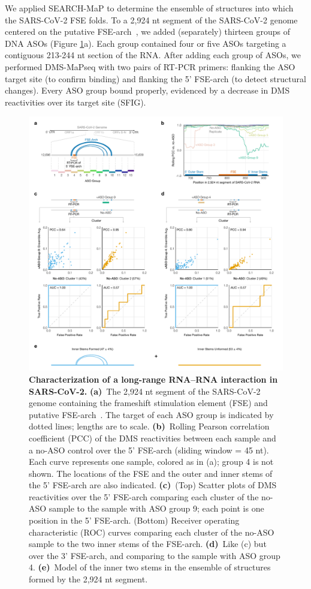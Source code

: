 \documentclass[main.tex]{subfiles}
\begin{document}
We applied SEARCH-MaP to determine the ensemble of structures into which the SARS-CoV-2 FSE folds.
To a 2,924 nt segment of the SARS-CoV-2 genome centered on the putative FSE-arch~\cite{Ziv2020}, we added (separately) thirteen groups of DNA ASOs (Figure \ref{tiles}a).
Each group contained four or five ASOs targeting a contiguous 213-244 nt section of the RNA.
After adding each group of ASOs, we performed DMS-MaPseq with two pairs of RT-PCR primers: flanking the ASO target site (to confirm binding) and flanking the 5' FSE-arch (to detect structural changes).
Every ASO group bound properly, evidenced by a decrease in DMS reactivities over its target site (SFIG).

\begin{figure}[H]
	\includegraphics[width=\textwidth]{../MainFigures/sars2-tile/sars2-tile.pdf}
	\caption{\textbf{Characterization of a long-range RNA--RNA interaction in SARS-CoV-2.} \textbf{(a)}~The 2,924 nt segment of the SARS-CoV-2 genome containing the frameshift stimulation element (FSE) and putative FSE-arch~\cite{Ziv2020}. The target of each ASO group is indicated by dotted lines; lengths are to scale. \textbf{(b)}~Rolling Pearson correlation coefficient (PCC) of the DMS reactivities between each sample and a no-ASO control over the 5' FSE-arch (sliding window = 45 nt). Each curve represents one sample, colored as in (a); group 4 is not shown. The locations of the FSE and the outer and inner stems of the 5' FSE-arch are also indicated. \textbf{(c)}~(Top) Scatter plots of DMS reactivities over the 5' FSE-arch comparing each cluster of the no-ASO sample to the sample with ASO group 9; each point is one position in the 5' FSE-arch. (Bottom) Receiver operating characteristic (ROC) curves comparing each cluster of the no-ASO sample to the two inner stems of the FSE-arch. \textbf{(d)}~Like (c) but over the 3' FSE-arch, and comparing to the sample with ASO group 4. \textbf{(e)}~Model of the inner two stems in the ensemble of structures formed by the 2,924 nt segment.}
	\label{tiles}
\end{figure}
\end{document}
